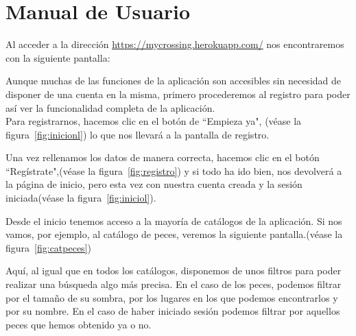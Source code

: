 \chapter{Manual de Usuario}\label{manual}

Al acceder a la dirección \href{https://mycrossing.herokuapp.com/}{https://mycrossing.herokuapp.com/} nos encontraremos con la siguiente pantalla:\\


Aunque muchas de las funciones de la aplicación son accesibles sin necesidad de disponer de una cuenta en la misma, primero procederemos al registro para poder así ver la funcionalidad completa de la aplicación.\\

Para registrarnos, hacemos clic en el botón de ``Empieza ya", {(v\'ease la figura~\ref{fig:inicionl})} lo que nos llevará a la pantalla de registro.\\

\clearpage


Una vez rellenamos los datos de manera correcta, hacemos clic en el botón ``Regístrate",{(v\'ease la figura~\ref{fig:registro})} y si todo ha ido bien, nos devolverá a la página de inicio, pero esta vez con nuestra cuenta creada y la sesión iniciada{(v\'ease la figura~\ref{fig:iniciol})}.\\


\clearpage

Desde el inicio tenemos acceso a la mayoría de catálogos de la aplicación. Si nos vamos, por ejemplo, al catálogo de peces, veremos la siguiente pantalla.{(v\'ease la figura~\ref{fig:catpeces})}\\


Aquí, al igual que en todos los catálogos, disponemos de unos filtros para poder realizar una búsqueda algo más precisa. En el caso de los peces, podemos filtrar por el tamaño de su sombra, por los lugares en los que podemos encontrarlos y por su nombre. En el caso de haber iniciado sesión podemos filtrar por aquellos peces que hemos obtenido ya o no.\\


